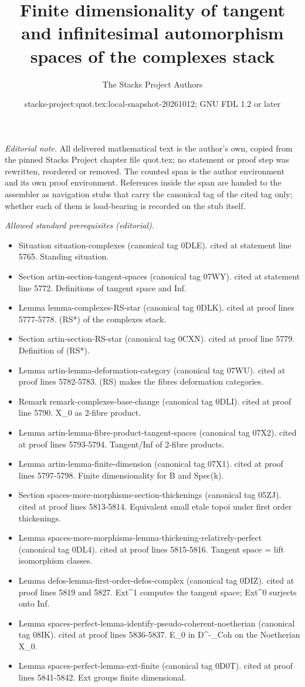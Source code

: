 \documentclass{stacks-project}
\title{Finite dimensionality of tangent and infinitesimal automorphism spaces of the complexes stack}
\author{The Stacks Project Authors}
\date{stacks-project:quot.tex:local-snapshot-20261012; GNU FDL 1.2 or later}
\theoremstyle{plain}
\theoremstyle{definition}
\theoremstyle{remark}
\numberwithin{equation}{subsection}
\begin{document}
\maketitle
\setcounter{subsection}{1}
\noindent\textit{Editorial note.} All delivered mathematical text is the author's own, copied from the pinned Stacks Project chapter file quot.tex; no statement or proof step was rewritten, reordered or removed. The counted span is the author environment and its own proof environment. References inside the span are handed to the assembler as navigation stubs that carry the canonical tag of the cited tag only; whether each of them is load-bearing is recorded on the stub itself.\par\medskip
\noindent\textit{Allowed standard prerequisites (editorial).}\begin{itemize}
\item Situation situation-complexes (canonical tag 0DLE). cited at statement line 5765. Standing situation.
\item Section artin-section-tangent-spaces (canonical tag 07WY). cited at statement line 5772. Definitions of tangent space and Inf.
\item Lemma lemma-complexes-RS-star (canonical tag 0DLK). cited at proof lines 5777-5778. (RS*) of the complexes stack.
\item Section artin-section-RS-star (canonical tag 0CXN). cited at proof line 5779. Definition of (RS*).
\item Lemma artin-lemma-deformation-category (canonical tag 07WU). cited at proof lines 5782-5783. (RS) makes the fibres deformation categories.
\item Remark remark-complexes-base-change (canonical tag 0DLI). cited at proof line 5790. X\_0 as 2-fibre product.
\item Lemma artin-lemma-fibre-product-tangent-spaces (canonical tag 07X2). cited at proof lines 5793-5794. Tangent/Inf of 2-fibre products.
\item Lemma artin-lemma-finite-dimension (canonical tag 07X1). cited at proof lines 5797-5798. Finite dimensionality for B and Spec(k).
\item Section spaces-more-morphisms-section-thickenings (canonical tag 05ZJ). cited at proof lines 5813-5814. Equivalent small etale topoi under first order thickenings.
\item Lemma spaces-more-morphisms-lemma-thickening-relatively-perfect (canonical tag 0DL4). cited at proof lines 5815-5816. Tangent space = lift isomorphism classes.
\item Lemma defos-lemma-first-order-defos-complex (canonical tag 0DIZ). cited at proof lines 5819 and 5827. Ext\textasciicircum{}1 computes the tangent space; Ext\textasciicircum{}0 surjects onto Inf.
\item Lemma spaces-perfect-lemma-identify-pseudo-coherent-noetherian (canonical tag 08IK). cited at proof lines 5836-5837. E\_0 in D\textasciicircum{}-\_Coh on the Noetherian X\_0.
\item Lemma spaces-perfect-lemma-ext-finite (canonical tag 0D0T). cited at proof lines 5841-5842. Ext groups finite dimensional.
\end{itemize}\medskip
\end{document}
